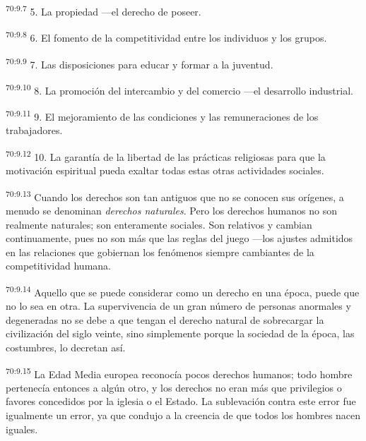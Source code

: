 \documentclass[twoside, 11pt]{book}
\begin{document}
\par
\textsuperscript{70:9.7} 5. La propiedad ---el derecho de poseer.

\par
\textsuperscript{70:9.8} 6. El fomento de la competitividad entre los individuos y los grupos.

\par
\textsuperscript{70:9.9} 7. Las disposiciones para educar y formar a la juventud.

\par
\textsuperscript{70:9.10} 8. La promoción del intercambio y del comercio ---el desarrollo industrial.

\par
\textsuperscript{70:9.11} 9. El mejoramiento de las condiciones y las remuneraciones de los trabajadores.

\par
\textsuperscript{70:9.12} 10. La garantía de la libertad de las prácticas religiosas para que la motivación espiritual pueda exaltar todas estas otras actividades sociales.

\par
\textsuperscript{70:9.13} Cuando los derechos son tan antiguos que no se conocen sus orígenes, a menudo se denominan \textit{derechos naturales}. Pero los derechos humanos no son realmente naturales; son enteramente sociales. Son relativos y cambian continuamente, pues no son más que las reglas del juego ---los ajustes admitidos en las relaciones que gobiernan los fenómenos siempre cambiantes de la competitividad humana.

\par
\textsuperscript{70:9.14} Aquello que se puede considerar como un derecho en una época, puede que no lo sea en otra. La supervivencia de un gran número de personas anormales y degeneradas no se debe a que tengan el derecho natural de sobrecargar la civilización del siglo veinte, sino simplemente porque la sociedad de la época, las costumbres, lo decretan así.

\par
\textsuperscript{70:9.15} La Edad Media europea reconocía pocos derechos humanos; todo hombre pertenecía entonces a algún otro, y los derechos no eran más que privilegios o favores concedidos por la iglesia o el Estado. La sublevación contra este error fue igualmente un error, ya que condujo a la creencia de que todos los hombres nacen iguales.
\end{document}
